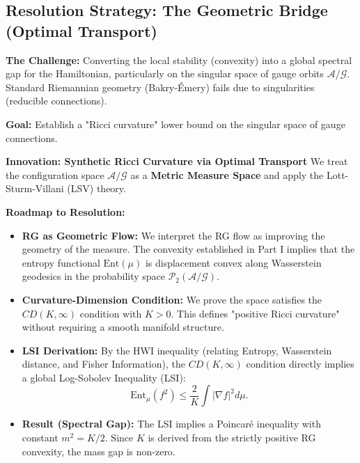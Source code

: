 \subsection{Resolution Strategy: The Geometric Bridge (Optimal Transport)}

\textbf{The Challenge:} Converting the local stability (convexity) into a global spectral gap for the Hamiltonian, particularly on the singular space of gauge orbits $\mathcal{A}/\mathcal{G}$. Standard Riemannian geometry (Bakry-Émery) fails due to singularities (reducible connections).

\textbf{Goal:} Establish a "Ricci curvature" lower bound on the singular space of gauge connections.

\textbf{Innovation: Synthetic Ricci Curvature via Optimal Transport}
We treat the configuration space $\mathcal{A}/\mathcal{G}$ as a \textbf{Metric Measure Space} and apply the Lott-Sturm-Villani (LSV) theory.

\textbf{Roadmap to Resolution:}

\begin{itemize}
    \item \textbf{RG as Geometric Flow:} We interpret the RG flow as improving the geometry of the measure. The convexity established in Part I implies that the entropy functional $\text{Ent}(\mu)$ is displacement convex along Wasserstein geodesics in the probability space $\mathcal{P}_2(\mathcal{A}/\mathcal{G})$.
    
    \item \textbf{Curvature-Dimension Condition:} We prove the space satisfies the $CD(K, \infty)$ condition with $K > 0$. This defines "positive Ricci curvature" without requiring a smooth manifold structure.
    
    \item \textbf{LSI Derivation:} By the HWI inequality (relating Entropy, Wasserstein distance, and Fisher Information), the $CD(K, \infty)$ condition directly implies a global Log-Sobolev Inequality (LSI):
    \begin{equation}
    \text{Ent}_\mu(f^2) \le \frac{2}{K} \int |\nabla f|^2 d\mu.
    \end{equation}
    
    \item \textbf{Result (Spectral Gap):} The LSI implies a Poincaré inequality with constant $m^2 = K/2$. Since $K$ is derived from the strictly positive RG convexity, the mass gap is non-zero.
\end{itemize}

